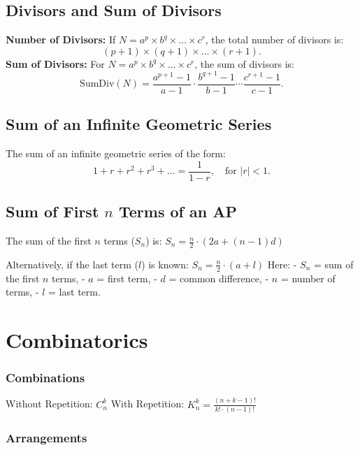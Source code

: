 \subsection{Divisors and Sum of Divisors}
    \textbf{Number of Divisors:}  
    If \( N = a^p \times b^q \times \dots \times c^r \), the total number of divisors is:  
    \[
    (p+1) \times (q+1) \times \dots \times (r+1).
    \]  
    \textbf{Sum of Divisors:}  
    For \( N = a^p \times b^q \times \dots \times c^r \), the sum of divisors is:  
    \[
    \text{SumDiv}(N) = \frac{a^{p+1} - 1}{a-1} \cdot \frac{b^{q+1} - 1}{b-1} \cdots \frac{c^{r+1} - 1}{c-1}.
    \]  

\subsection{Sum of an Infinite Geometric Series}  
    The sum of an infinite geometric series of the form:  
    \[
    1 + r + r^2 + r^3 + \ldots = \frac{1}{1 - r}, \quad \text{for } |r| < 1.
    \]

\subsection{Sum of First \( n \) Terms of an AP}
    The sum of the first \( n \) terms (\( S_n \)) is:  
    $S_n = \frac{n}{2} \cdot (2a + (n - 1)d)$

    Alternatively, if the last term (\( l \)) is known:  
    $S_n = \frac{n}{2} \cdot (a + l)$
    Here:  
    - \( S_n \) = sum of the first \( n \) terms,  
    - \( a \) = first term,  
    - \( d \) = common difference,  
    - \( n \) = number of terms,  
    - \( l \) = last term.


\section{Combinatorics}

    \subsubsection{Combinations}  
    
    Without Repetition: $C_{n}^{k}$
    With Repetition: $K_{n}^{k} = \frac{(n + k - 1)!}{k! \cdot (n - 1)!}$
    
    \subsubsection{Arrangements}  
    
